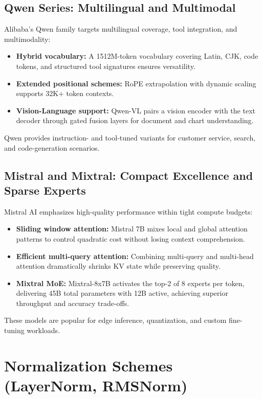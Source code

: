 \documentclass{article}
\begin{document}
\subsection{Qwen Series: Multilingual and Multimodal}
Alibaba's Qwen family targets multilingual coverage, tool integration, and multimodality:
\begin{itemize}
  \item \textbf{Hybrid vocabulary:} A 1512M-token vocabulary covering Latin, CJK, code tokens, and structured tool signatures ensures versatility.
  \item \textbf{Extended positional schemes:} RoPE extrapolation with dynamic scaling supports 32K+ token contexts.
  \item \textbf{Vision-Language support:} Qwen-VL pairs a vision encoder with the text decoder through gated fusion layers for document and chart understanding.
\end{itemize}
Qwen provides instruction- and tool-tuned variants for customer service, search, and code-generation scenarios.

\subsection{Mistral and Mixtral: Compact Excellence and Sparse Experts}
Mistral AI emphasizes high-quality performance within tight compute budgets:
\begin{itemize}
  \item \textbf{Sliding window attention:} Mistral 7B mixes local and global attention patterns to control quadratic cost without losing context comprehension.
  \item \textbf{Efficient multi-query attention:} Combining multi-query and multi-head attention dramatically shrinks KV state while preserving quality.
  \item \textbf{Mixtral MoE:} Mixtral-8x7B activates the top-2 of 8 experts per token, delivering 45B total parameters with 12B active, achieving superior throughput and accuracy trade-offs.
\end{itemize}
These models are popular for edge inference, quantization, and custom fine-tuning workloads.

\section{Normalization Schemes (LayerNorm, RMSNorm)}
\end{document}
